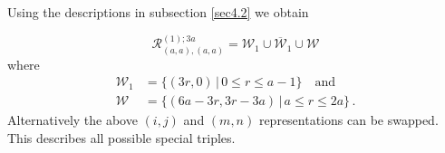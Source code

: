 \documentclass[a4paper,11pt]{article}
\DeclarePairedDelimiter\floor{\lfloor}{\rfloor}
\theoremstyle{plain}
\theoremstyle{definition}
\newcommand{\mycomment}[1]{}
\begin{document}
Using the descriptions in subsection \ref{sec4.2}  we obtain
\mycomment{
\begin{equation}\label{class1}
   (m,n)\in  \mathcal{R}^{(1);3a}_{(a,a),(a,a)} = \mathcal{W}_1\cup \overline{\mathcal{W}}_1\cup \mathcal{W}_2\cup \overline{\mathcal{W}}_2
\end{equation}
where
\begin{align}\label{class11}
    \mathcal{W}_1 &= \{(3r,0)\,|\, 0\leq r\leq a-1\} \nonumber \\
   \mathcal{W}_2 & = \bigg\{(6a-3r,3r-3a)\,|\, a\leq r\leq \floor*{\frac{3a}{2}}\bigg\}\,.
\end{align}
By noticing
\begin{equation}
    \mathcal{W}_2\cup \overline{\mathcal{W}}_2 = \{(6a-3r,3r-3a)\,|\, a\leq r\leq 2a\}
\end{equation}
we can rewrite \eqref{class1} equivalently as }
\begin{equation}\label{class2}
     \mathcal{R}^{(1);3a}_{(a,a),(a,a)} = \mathcal{W}_1\cup \overline{\mathcal{W}}_1\cup \mathcal{W}
\end{equation}
where
\begin{align}\label{class3}
 \mathcal{W}_1 & = \{(3r,0)\,|\, 0\leq r\leq a-1\} \quad \text{and}\nonumber \\
    \mathcal{W} &= \{(6a-3r,3r-3a)\,|\, a\leq r\leq 2a\} \, .
\end{align}
Alternatively the above $(i,j)$ and $(m,n)$ representations can be swapped. This describes all possible special triples.
\end{document}
